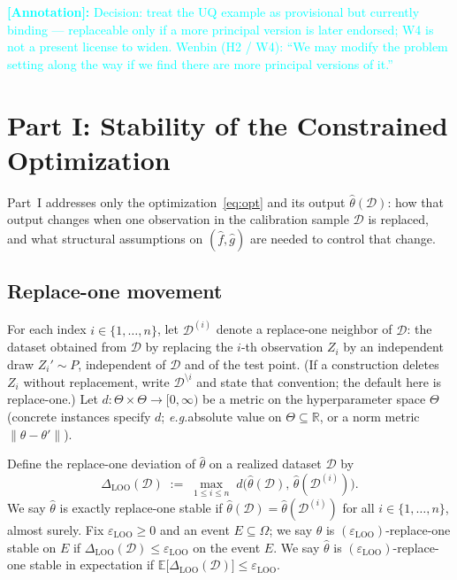 \documentclass[12pt]{article}
\theoremstyle{plain}
\newcommand*{\eg}{\emph{e.g.}{}}
\newcommand{\annote}[1]{\textcolor{cyan}{\textbf{[Annotation]:} #1}}
\begin{document}
\annote{Decision: treat the UQ example as provisional but currently binding --- replaceable only if a more principal version is later endorsed; W4 is not a present license to widen.
Wenbin (H2 / W4): ``We may modify the problem setting along the way if we find there are more principal versions of it.''}

\section{Part I: Stability of the Constrained Optimization}
\label{sec:part-i}

Part~I addresses only the optimization~\eqref{eq:opt} and its output $\hat\theta(\mathcal{D})$: how that output changes when one observation in the calibration sample $\mathcal{D}$ is replaced, and what structural assumptions on $(\hat f,\hat g)$ are needed to control that change.

\subsection{Replace-one movement}
\label{sec:loo}

\label{def:D-loo}
For each index $i\in\{1,\dots,n\}$, let $\mathcal{D}^{(i)}$ denote a replace-one neighbor of $\mathcal{D}$: the dataset obtained from $\mathcal{D}$ by replacing the $i$-th observation $Z_i$ by an independent draw $Z_i'\sim P$, independent of $\mathcal{D}$ and of the test point.
(If a construction deletes $Z_i$ without replacement, write $\mathcal{D}^{\setminus i}$ and state that convention; the default here is replace-one.)
\label{def:d-Theta}
Let $d:\Theta\times\Theta\to[0,\infty)$ be a metric on the hyperparameter space $\Theta$ (concrete instances specify $d$; \eg absolute value on $\Theta\subseteq\mathbb{R}$, or a norm metric $\|\theta-\theta'\|$).

\label{def:Delta-LOO}
Define the replace-one deviation of $\hat\theta$ on a realized dataset $\mathcal{D}$ by
\begin{equation}
  \label{eq:Delta-LOO}
  \Delta_{\mathrm{LOO}}(\mathcal{D})
  \;:=\;
  \max_{1\le i\le n}
  \;
  d\bigl(\hat\theta(\mathcal{D}),\,\hat\theta(\mathcal{D}^{(i)})\bigr).
\end{equation}
\label{def:exact-LOO}
We say $\hat\theta$ is exactly replace-one stable if
$\hat\theta(\mathcal{D})=\hat\theta(\mathcal{D}^{(i)})$ for all $i\in\{1,\dots,n\}$, almost surely.
\label{def:bounded-LOO}
Fix $\varepsilon_{\mathrm{LOO}}\ge 0$ and an event $E\subseteq\Omega$; we say $\hat\theta$ is $(\varepsilon_{\mathrm{LOO}})$-replace-one stable on $E$ if $\Delta_{\mathrm{LOO}}(\mathcal{D})\le\varepsilon_{\mathrm{LOO}}$ on the event $E$.
\label{def:expected-LOO}
We say $\hat\theta$ is $(\varepsilon_{\mathrm{LOO}})$-replace-one stable in expectation if $\mathbb{E}\bigl[\Delta_{\mathrm{LOO}}(\mathcal{D})\bigr]\le\varepsilon_{\mathrm{LOO}}$.
\end{document}
